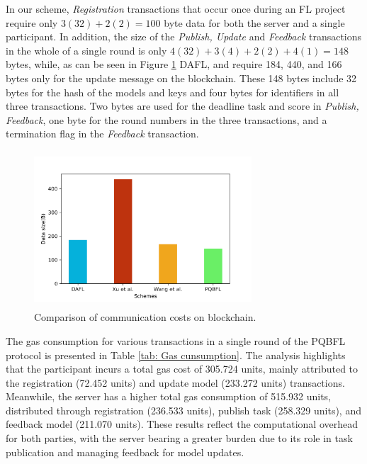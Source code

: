 \documentclass[a4paper,fleqn]{cas-dc}
\begin{document}
In our scheme, \textit{Registration} transactions that occur once during an FL project require only $3(32)+2(2)=100$ byte data for both the server and a single participant. 
In addition, the size of the \textit{Publish, Update} and \textit{Feedback} transactions in the whole of a single round is only $4(32)+3(4)+2(2)+4(1)=148$ bytes, while, as can be seen in Figure \ref{fig: compare data on-chain} DAFL\citep{Blockchain-based_decentralized}, \citep{A_certificateless_signcryption} and \citep{Secure-enhanced} require 184, 440, and 166 bytes only for the update message on the blockchain. 
These 148 bytes include 32 bytes for the hash of the models and keys and four bytes for identifiers in all three transactions. 
Two bytes are used for the deadline task and score in \textit{Publish, Feedback}, one byte for the round numbers in the three transactions, and a termination flag in the \textit{Feedback} transaction.

\begin{figure}[ht]
    \centering
\includegraphics[width=3.2in,height=2.3in]{Images/9.png}
    \caption{Comparison of communication costs on blockchain.}
    \label{fig: compare data on-chain}
\end{figure}





The gas consumption for various transactions in a single round of the PQBFL protocol is presented in Table \ref{tab: Gas cunsumption}. 
The analysis highlights that the participant incurs a total gas cost of 305.724 units, mainly attributed to the registration (72.452 units) and update model (233.272 units) transactions. 
Meanwhile, the server has a higher total gas consumption of 515.932 units, distributed through registration (236.533 units), publish task (258.329 units), and feedback model (211.070 units). These results reflect the computational overhead for both parties, with the server bearing a greater burden due to its role in task publication and managing feedback for model updates.
\end{document}
